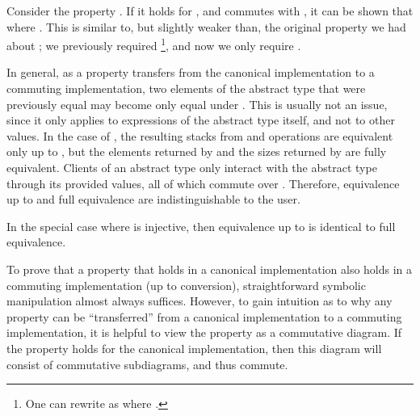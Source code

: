\documentclass[12pt]{article}
\begin{document}
   \noindent Consider the property . If it holds for , and  commutes with , it can be shown that  where . This is similar to, but slightly weaker than, the original property we had about ; we previously required \footnote{One can rewrite  as  where .}, and now we only require .

   \bigskip

   \noindent In general, as a property transfers from the canonical implementation to a commuting implementation, two elements of the abstract type that were previously equal may become only equal under . This is usually not an issue, since it only applies to expressions of the abstract type itself, and not to other values. In the case of , the resulting stacks from  and  operations are equivalent only up to , but the elements returned by  and the sizes returned by  are fully equivalent. Clients of an abstract type only interact with the abstract type through its provided values, all of which commute over . Therefore, equivalence up to  and full equivalence are indistinguishable to the user.

   \bigskip

   \noindent In the special case where  is injective, then equivalence up to  is identical to full equivalence.

   \bigskip

   \noindent To prove that a property that holds in a canonical implementation also holds in a commuting implementation (up to conversion), straightforward symbolic manipulation almost always suffices. However, to gain intuition as to why any property can be ``transferred'' from a canonical implementation to a commuting implementation, it is helpful to view the property as a commutative diagram. If the property holds for the canonical implementation, then this diagram will consist of commutative subdiagrams, and thus commute.
\end{document}
